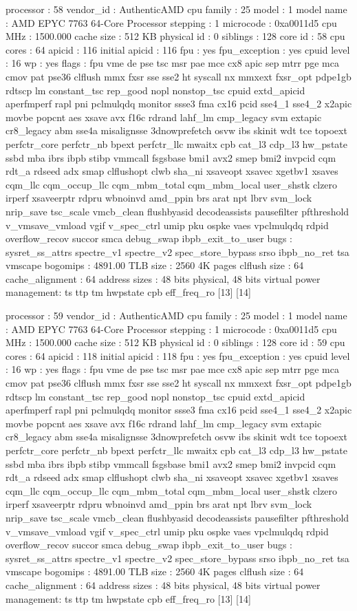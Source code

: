 processor	: 58
vendor_id	: AuthenticAMD
cpu family	: 25
model		: 1
model name	: AMD EPYC 7763 64-Core Processor
stepping	: 1
microcode	: 0xa0011d5
cpu MHz		: 1500.000
cache size	: 512 KB
physical id	: 0
siblings	: 128
core id		: 58
cpu cores	: 64
apicid		: 116
initial apicid	: 116
fpu		: yes
fpu_exception	: yes
cpuid level	: 16
wp		: yes
flags		: fpu vme de pse tsc msr pae mce cx8 apic sep mtrr pge mca cmov pat pse36 clflush mmx fxsr sse sse2 ht syscall nx mmxext fxsr_opt pdpe1gb rdtscp lm constant_tsc rep_good nopl nonstop_tsc cpuid extd_apicid aperfmperf rapl pni pclmulqdq monitor ssse3 fma cx16 pcid sse4_1 sse4_2 x2apic movbe popcnt aes xsave avx f16c rdrand lahf_lm cmp_legacy svm extapic cr8_legacy abm sse4a misalignsse 3dnowprefetch osvw ibs skinit wdt tce topoext perfctr_core perfctr_nb bpext perfctr_llc mwaitx cpb cat_l3 cdp_l3 hw_pstate ssbd mba ibrs ibpb stibp vmmcall fsgsbase bmi1 avx2 smep bmi2 invpcid cqm rdt_a rdseed adx smap clflushopt clwb sha_ni xsaveopt xsavec xgetbv1 xsaves cqm_llc cqm_occup_llc cqm_mbm_total cqm_mbm_local user_shstk clzero irperf xsaveerptr rdpru wbnoinvd amd_ppin brs arat npt lbrv svm_lock nrip_save tsc_scale vmcb_clean flushbyasid decodeassists pausefilter pfthreshold v_vmsave_vmload vgif v_spec_ctrl umip pku ospke vaes vpclmulqdq rdpid overflow_recov succor smca debug_swap ibpb_exit_to_user
bugs		: sysret_ss_attrs spectre_v1 spectre_v2 spec_store_bypass srso ibpb_no_ret tsa vmscape
bogomips	: 4891.00
TLB size	: 2560 4K pages
clflush size	: 64
cache_alignment	: 64
address sizes	: 48 bits physical, 48 bits virtual
power management: ts ttp tm hwpstate cpb eff_freq_ro [13] [14]

processor	: 59
vendor_id	: AuthenticAMD
cpu family	: 25
model		: 1
model name	: AMD EPYC 7763 64-Core Processor
stepping	: 1
microcode	: 0xa0011d5
cpu MHz		: 1500.000
cache size	: 512 KB
physical id	: 0
siblings	: 128
core id		: 59
cpu cores	: 64
apicid		: 118
initial apicid	: 118
fpu		: yes
fpu_exception	: yes
cpuid level	: 16
wp		: yes
flags		: fpu vme de pse tsc msr pae mce cx8 apic sep mtrr pge mca cmov pat pse36 clflush mmx fxsr sse sse2 ht syscall nx mmxext fxsr_opt pdpe1gb rdtscp lm constant_tsc rep_good nopl nonstop_tsc cpuid extd_apicid aperfmperf rapl pni pclmulqdq monitor ssse3 fma cx16 pcid sse4_1 sse4_2 x2apic movbe popcnt aes xsave avx f16c rdrand lahf_lm cmp_legacy svm extapic cr8_legacy abm sse4a misalignsse 3dnowprefetch osvw ibs skinit wdt tce topoext perfctr_core perfctr_nb bpext perfctr_llc mwaitx cpb cat_l3 cdp_l3 hw_pstate ssbd mba ibrs ibpb stibp vmmcall fsgsbase bmi1 avx2 smep bmi2 invpcid cqm rdt_a rdseed adx smap clflushopt clwb sha_ni xsaveopt xsavec xgetbv1 xsaves cqm_llc cqm_occup_llc cqm_mbm_total cqm_mbm_local user_shstk clzero irperf xsaveerptr rdpru wbnoinvd amd_ppin brs arat npt lbrv svm_lock nrip_save tsc_scale vmcb_clean flushbyasid decodeassists pausefilter pfthreshold v_vmsave_vmload vgif v_spec_ctrl umip pku ospke vaes vpclmulqdq rdpid overflow_recov succor smca debug_swap ibpb_exit_to_user
bugs		: sysret_ss_attrs spectre_v1 spectre_v2 spec_store_bypass srso ibpb_no_ret tsa vmscape
bogomips	: 4891.00
TLB size	: 2560 4K pages
clflush size	: 64
cache_alignment	: 64
address sizes	: 48 bits physical, 48 bits virtual
power management: ts ttp tm hwpstate cpb eff_freq_ro [13] [14]

